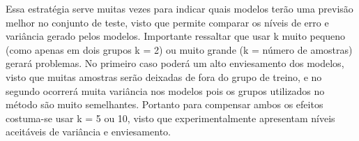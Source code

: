 Essa estratégia serve muitas vezes para indicar quais modelos terão uma previsão melhor no conjunto de teste, visto que permite comparar os níveis de erro e variância gerado pelos modelos. Importante ressaltar que usar k muito pequeno (como apenas em dois grupos k = 2) ou muito grande (k = número de amostras) gerará problemas. No primeiro caso poderá um alto enviesamento dos modelos, visto que muitas amostras serão deixadas de fora do grupo de treino, e no segundo ocorrerá muita variância nos modelos pois os grupos utilizados no método são muito semelhantes. Portanto para compensar ambos os efeitos costuma-se usar k = 5 ou 10, visto que experimentalmente apresentam níveis aceitáveis de variância e enviesamento.
